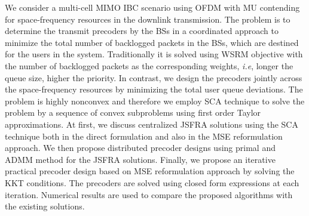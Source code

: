 We consider a multi-cell \ac{MIMO} \acl{IBC} scenario using \ac{OFDM} with \acl{MU} contending for space-frequency resources in the downlink transmission. The problem is to determine the transmit precoders by the \acp{BS} in a coordinated approach to minimize the total number of backlogged packets in the \acp{BS}, which are destined for the users in the system. Traditionally it is solved using \ac{WSRM} objective with the number of backlogged packets as the corresponding weights, \textit{i.e}, longer the queue size, higher the priority. In contrast, we design the precoders jointly across the space-frequency resources by minimizing the total user queue deviations. The problem is highly nonconvex and therefore we employ \ac{SCA} technique to solve the problem by a sequence of convex subproblems using first order Taylor approximations. At first, we discuss centralized \ac{JSFRA} solutions using the \ac{SCA} technique both in the direct formulation and also in the \ac{MSE} reformulation approach. We then propose distributed precoder designs using primal and \ac{ADMM} method for the \ac{JSFRA} solutions. Finally, we propose an iterative practical precoder design based on \ac{MSE} reformulation approach by solving the \ac{KKT} conditions. The precoders are solved using closed form expressions at each iteration. Numerical results are used to compare the proposed algorithms with the existing solutions.



